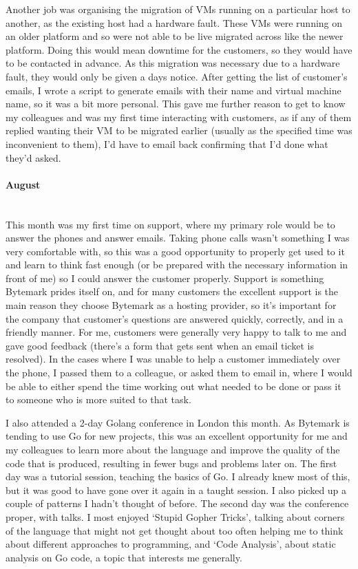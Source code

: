 \documentclass[12pt,a4paper]{article}
\newcommand{\paragraphnl}[1]{\paragraph{#1}\mbox{}\\}
\begin{document}
	Another job was organising the migration of VMs running on a particular
	host to another, as the existing host had a hardware fault. These VMs were
	running on an older platform and so were not able to be live migrated
	across like the newer platform. Doing this would mean downtime for the
	customers, so they would have to be contacted in advance. As this migration
	was necessary due to a hardware fault, they would only be given a days
	notice. After getting the list of customer's emails, I wrote a script to
	generate emails with their name and virtual machine name, so it was a bit
	more personal. This gave me further reason to get to know my colleagues and
	was my first time interacting with customers, as if any of them replied
	wanting their VM to be migrated earlier (usually as the specified time was
	inconvenient to them), I'd have to email back confirming that I'd done what
	they'd asked.

\paragraphnl{August}
	This month was my first time on support, where my primary role would be to
	answer the phones and answer emails. Taking phone calls wasn't something I
	was very comfortable with, so this was a good opportunity to properly get
	used to it and learn to think fast enough (or be prepared with the
	necessary information in front of me) so I could answer the customer
	properly. Support is something Bytemark prides itself on, and for many
	customers the excellent support is the main reason they choose Bytemark as
	a hosting provider, so it's important for the company that customer's
	questions are answered quickly, correctly, and in a friendly manner. For
	me, customers were generally very happy to talk to me and gave good
	feedback (there's a form that gets sent when an email ticket is resolved).
	In the cases where I was unable to help a customer immediately over the
	phone, I passed them to a colleague, or asked them to email in, where I
	would be able to either spend the time working out what needed to be done
	or pass it to someone who is more suited to that task.

	I also attended a 2-day Golang conference in London this month. As Bytemark
	is tending to use Go for new projects, this was an excellent opportunity
	for me and my colleagues to learn more about the language and improve the
	quality of the code that is produced, resulting in fewer bugs and problems
	later on. The first day was a tutorial session, teaching the basics of Go.
	I already knew most of this, but it was good to have gone over it again
	in a taught session. I also picked up a couple of patterns I hadn't thought
	of before. The second day was the conference proper, with talks. I most
	enjoyed `Stupid Gopher Tricks', talking about corners of the language that
	might not get thought about too often helping me to think about different
	approaches to programming, and `Code Analysis', about static analysis on
	Go code, a topic that interests me generally.
\end{document}
